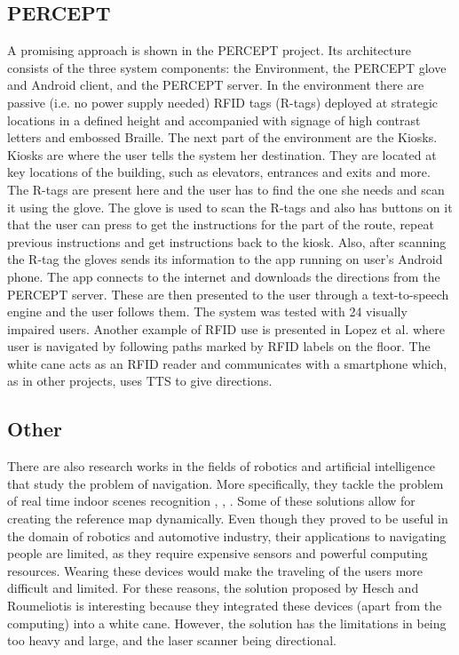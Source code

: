 \subsection{PERCEPT}
A promising approach is shown in the PERCEPT \cite{percept} project. Its architecture consists of the three system components: the Environment, the PERCEPT glove and Android client, and
the PERCEPT server. In the environment there are passive (i.e. no power supply needed) RFID tags (R-tags) deployed at strategic locations in a defined height and accompanied with signage of high contrast letters and embossed Braille. The next part of the environment are the Kiosks. Kiosks are where the user tells the system her destination. They are located at key locations of the building, such as elevators, entrances and exits and more. The R-tags are present here and the user has to find the one she needs and scan it using the glove.
The glove is used to scan the R-tags and also has buttons on it that the user can press to get the instructions for the part of the route, repeat previous instructions and get instructions back to the kiosk. Also, after scanning the R-tag the gloves sends its information to the app running on user's Android phone. The app connects to the internet and downloads the directions from the PERCEPT server. These are then presented to the user through a text-to-speech engine and the user follows them. The system was tested with 24 visually impaired users.
Another example of RFID use is presented in Lopez et al. \cite{lopez} where user is navigated by following paths marked by RFID labels on the floor. The white cane acts as an RFID reader and communicates with a smartphone which, as in other projects, uses TTS to give directions.
\\
\subsection{Other}
There are also research works in the fields of robotics and artificial intelligence that study the problem of navigation. More specifically, they tackle the problem of real time indoor scenes recognition \cite{espinace}, \cite{quattoni}, \cite{bosch}. Some of these solutions allow for creating the reference map dynamically. Even though they proved to be useful in the domain of robotics and automotive industry, their applications to navigating people are limited, as they require expensive sensors and powerful computing resources. Wearing these devices would make the traveling of the users more difficult and limited. For these reasons, the solution proposed by Hesch and Roumeliotis \cite{hesch} is interesting because they integrated these devices (apart from the computing) into a white cane. However, the solution has the limitations in being too heavy and large, and the laser scanner being directional.

